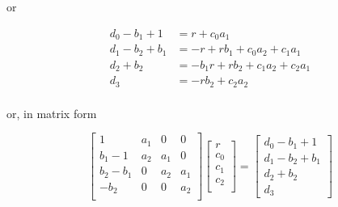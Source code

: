 or

\begin{align*}
    d_0 - b_1 + 1   &= r + c_0a_1 \\
    d_1 - b_2 + b_1 &= -r + rb_1 +c_0a_2 + c_1a_1 \\
    d_2 + b_2       &= -b_1r + rb_2 + c_1a_2 + c_2a_1 \\
    d_3             &= - rb_2 + c_2a_2 \\
\end{align*}

or, in matrix form

\begin{equation}
  \begin{bmatrix}
    1         & a_1 & 0   & 0   \\
    b_1 - 1   & a_2 & a_1 & 0   \\
    b_2 - b_1 & 0   & a_2 & a_1 \\
    -b_2      & 0   & 0   & a_2 \\
  \end{bmatrix}
  \begin{bmatrix}
    r   \\
    c_0 \\
    c_1 \\
    c_2 \\
  \end{bmatrix}
  =
  \begin{bmatrix}
    d_0 - b_1 + 1   \\
    d_1 - b_2 + b_1 \\
    d_2 + b_2       \\
    d_3
  \end{bmatrix}
  \label{eq:15}
\end{equation}
